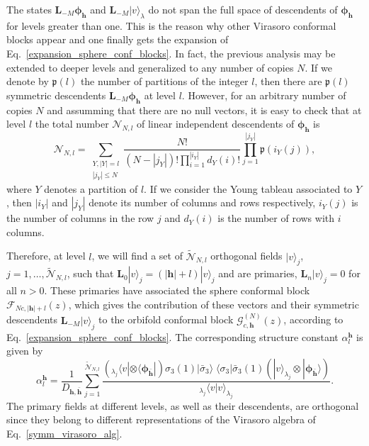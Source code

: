 \documentclass[a4paper,11pt]{article}
\begin{document}
The states $\boldsymbol{L}_{-M}\boldsymbol{\phi}_{\boldsymbol{h}}$ and $\boldsymbol{L}_{-M} |v\rangle_{\lambda}$ 
do not span the full space of descendents of $\boldsymbol{\phi}_{\boldsymbol{h}}$ for levels greater than one. 
This is the reason why other Virasoro conformal blocks appear and one finally gets the expansion of Eq.~\eqref{expansion_sphere_conf_blocks}. 
In fact, the previous analysis may be extended to deeper levels and generalized to any number of copies $N$.
If we denote by $\mathfrak{p}(l)$ the number of partitions of the integer $l$, then there are $\mathfrak{p}(l)$ symmetric
descendents $\boldsymbol{L}_{-M}\boldsymbol{\phi}_{\boldsymbol{h}}$ at level $l$. However,
for an arbitrary number of copies $N$ and assumming that there are no null vectors, it is easy to check that 
at level $l$ the total number $\mathcal{N}_{N, l}$ of linear independent descendents of $\boldsymbol{\phi}_{\boldsymbol{h}}$ is
\begin{equation}
 \mathcal{N}_{N, l}=\sum_{\substack{Y, |Y|=l \\ |j_Y|\leq N}}\frac{N!}{(N-|j_Y|)!
 \prod_{i=1}^{|i_Y|}d_Y(i)!}\prod_{j=1}^{|j_Y|}\mathfrak{p}(i_Y(j)),
\end{equation}
where $Y$ denotes a partition of $l$. If we consider the Young tableau
associated to $Y$, then $|i_Y|$ and  $|j_Y|$ denote its number of columns and
rows respectively, $i_Y(j)$ is the number of columns in the row $j$ and 
$d_Y(i)$ is the number of rows with $i$ columns.

Therefore, at level $l$, we will find a set of $\tilde{\mathcal{N}}_{N,l}$ orthogonal fields 
$|v\rangle_j$, $j=1,\dots, \tilde{\mathcal{N}}_{N,l}$,
such that $\boldsymbol{L}_0 |v\rangle_j=(|\boldsymbol{h}|+l)|v\rangle_j$ and are primaries,
$\boldsymbol{L}_n|v\rangle_j=0$ for all $n>0$. These primaries have associated the 
sphere conformal block $\mathcal{F}_{Nc, |\boldsymbol{h}|+l}(z)$, which gives the 
contribution of these vectors and their symmetric descendents $\boldsymbol{L}_{-M}|v\rangle_j$
to the orbifold conformal block $\mathcal{G}_{c, \boldsymbol{h}}^{(N)}(z)$, 
according to Eq.~\eqref{expansion_sphere_conf_blocks}. The corresponding structure constant $\alpha_l^{\boldsymbol{h}}$
is given by
\begin{equation}\label{alpha_l}
 \alpha_l^{\boldsymbol{h}}=\frac{1}{D_{\boldsymbol{h},\boldsymbol{\bar{h}}}}\sum_{j=1}^{\tilde{\mathcal{N}}_{N,l}}
 \frac{(_{\lambda_j}\langle v |\otimes \langle \boldsymbol{\phi}_{\boldsymbol{\bar{h}}}|)\sigma_{3}(1)|\bar{\sigma}_3\rangle \;\langle \sigma_{3}|\bar{\sigma}_3(1) (|v\rangle_{\lambda_j}\otimes |\boldsymbol{\phi}_{\boldsymbol{\bar{h}}}\rangle)}
 {_{\lambda_j}\langle v|v\rangle_{\lambda_j}}.
\end{equation}
The primary fields at 
different levels, as well as their descendents, are orthogonal
since they belong to different representations of the Virasoro algebra of Eq.~\eqref{symm_virasoro_alg}.
\end{document}
